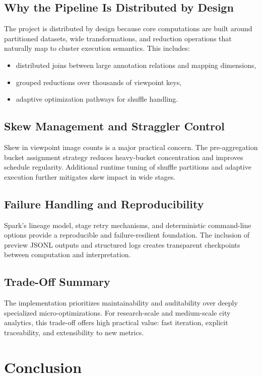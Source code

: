 \documentclass[journal,onecolumn]{IEEEtran}
\begin{document}
\subsection{Why the Pipeline Is Distributed by Design}
The project is distributed by design because core computations are built around partitioned datasets, wide transformations, and reduction operations that naturally map to cluster execution semantics. This includes:
\begin{itemize}
    \item distributed joins between large annotation relations and mapping dimensions,
    \item grouped reductions over thousands of viewpoint keys,
    \item adaptive optimization pathways for shuffle handling.
\end{itemize}

\subsection{Skew Management and Straggler Control}
Skew in viewpoint image counts is a major practical concern. The pre-aggregation bucket assignment strategy reduces heavy-bucket concentration and improves schedule regularity. Additional runtime tuning of shuffle partitions and adaptive execution further mitigates skew impact in wide stages.

\subsection{Failure Handling and Reproducibility}
Spark's lineage model, stage retry mechanisms, and deterministic command-line options provide a reproducible and failure-resilient foundation. The inclusion of preview JSONL outputs and structured logs creates transparent checkpoints between computation and interpretation.

\subsection{Trade-Off Summary}
The implementation prioritizes maintainability and auditability over deeply specialized micro-optimizations. For research-scale and medium-scale city analytics, this trade-off offers high practical value: fast iteration, explicit traceability, and extensibility to new metrics.

\section{Conclusion}
\end{document}
